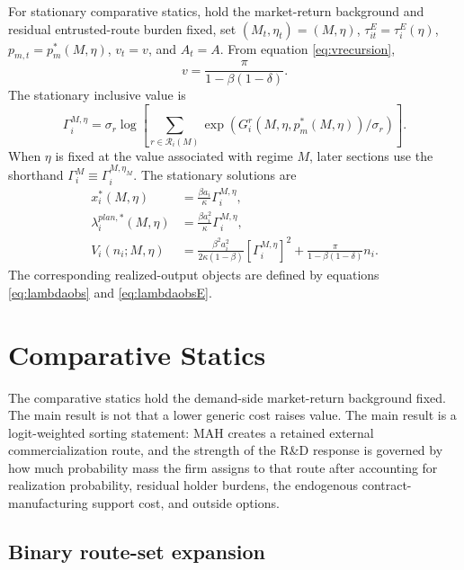 \documentclass[12pt]{article}
\newcommand{\1}{\mathbf{1}}
\newcommand{\calR}{\mathcal{R}}
\begin{document}
For stationary comparative statics, hold the market-return background and residual entrusted-route burden fixed, set $(M_t,\eta_t)=(M,\eta)$, $\tau^E_{it}=\tau_i^E(\eta)$, $p_{m,t}=p_m^*(M,\eta)$, $v_t=v$, and $A_t=A$. From equation \eqref{eq:vrecursion},
\begin{equation}
    v=\frac{\pi}{1-\beta(1-\delta)}.
    \label{eq:vstationary}
\end{equation}
The stationary inclusive value is
\begin{equation}
    \Gamma_i^{M,\eta}
    =
    \sigma_r
    \log
    \left[
    \sum_{r\in\calR_i(M)}
    \exp(G_i^r(M,\eta,p_m^*(M,\eta))/\sigma_r)
    \right].
    \label{eq:Gamma_stationary}
\end{equation}
When $\eta$ is fixed at the value associated with regime $M$, later sections use the shorthand $\Gamma_i^M\equiv\Gamma_i^{M,\eta_M}$. The stationary solutions are
\begin{align}
    x_i^*(M,\eta)&=\frac{\beta a_i}{\kappa}\Gamma_i^{M,\eta},\label{eq:xstationary}\\
    \lambda_i^{plan,*}(M,\eta)&=\frac{\beta a_i^2}{\kappa}\Gamma_i^{M,\eta},\label{eq:lambdastationary}\\
    V_i(n_i;M,\eta)&=\frac{\beta^2 a_i^2}{2\kappa(1-\beta)}\left[\Gamma_i^{M,\eta}\right]^2+\frac{\pi}{1-\beta(1-\delta)}n_i.\label{eq:Vstationary}
\end{align}
The corresponding realized-output objects are defined by equations \eqref{eq:lambdaobs} and \eqref{eq:lambdaobsE}.

\section{Comparative Statics}

The comparative statics hold the demand-side market-return background fixed. The main result is not that a lower generic cost raises value. The main result is a logit-weighted sorting statement: MAH creates a retained external commercialization route, and the strength of the R\&D response is governed by how much probability mass the firm assigns to that route after accounting for realization probability, residual holder burdens, the endogenous contract-manufacturing support cost, and outside options.

\subsection{Binary route-set expansion}
\end{document}
